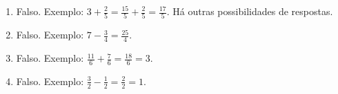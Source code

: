 \documentclass[10 pt,usenames,dvipsnames, oneside]{article}
\begin{document}
\ifdefined\prof
\begin{solucao}

\begin{enumerate}
    \item       Falso. Exemplo: $3 + \frac{2}{5} = \frac{15}{5}+\frac{2}{5} = \frac{17}{5}$.  Há outras possibilidades de respostas.
    \item       Falso. Exemplo:       $7 - \frac{3}{4} = \frac{25}{4}$.
    \item       Falso. Exemplo:       $\frac{11}{6} + \frac{7}{6} = \frac{18}{6} = 3$.
    \item       Falso. Exemplo:       $\frac{3}{2} - \frac{1}{2} = \frac{2}{2} = 1$.
\end{enumerate}

\end{solucao}
\fi
\end{document}
